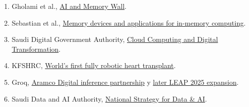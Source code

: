 \begin{enumerate}
  \item Gholami et al., \href{https://arxiv.org/abs/2403.14123}{AI and Memory Wall}.
  \item Sebastian et al., \href{https://www.nature.com/articles/s41565-020-0655-z}{Memory devices and applications for in-memory computing}.
  \item Saudi Digital Government Authority, \href{https://dga.gov.sa/sites/default/files/2024-08/Cloud%20Computing%20and%20its%20Role%20in%20Accelerating%20Digital%20Transformation%20and%20its%20Sustainable%20Impact%20in%20the%20Government%20Sector%20-%20V1.0.pdf}{Cloud Computing and Digital Transformation}.
  \item KFSHRC, \href{https://www.kfshrc.edu.sa/en/news/2024/09/kfshrc-pioneers-worlds-first-fully-robotic-heart-transplant}{World's first fully robotic heart transplant}.
  \item Groq, \href{https://groq.com/news_press/groq-and-aramco-digital-announce-partnership-to-establish-worlds-largest-inferenc-data-center-in-saudi-arabia}{Aramco Digital inference partnership} y \href{https://groq.com/news_press/saudi-arabia-announces-1-5b-expansion-to-fuel-ai-powered-economy-with-groq}{later LEAP 2025 expansion}.
  \item Saudi Data and AI Authority, \href{https://sdaia.gov.sa/en/SDAIA/about/Pages/Strategy.aspx}{National Strategy for Data \& AI}.
\end{enumerate}


